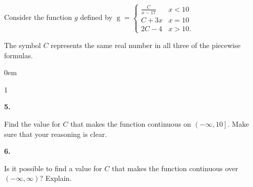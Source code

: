 \documentclass[12pt,]{book}
\newcommand{\lt}{<}
\newcommand{\gt}{>}
\theoremstyle{plain}
\theoremstyle{definition}
\numberwithin{equation}{section}
\newenvironment{exercisegroup}%
{\medskip\noindent}%
{\par\bigskip}%
\newlength{\exercisegroupindent}%
\newlength{\exercisegroupitemwidth}%
\newenvironment{exercisegrouplist}%
{\vspace{-\partopsep}%
\begin{adjustwidth}{\exercisegroupindent}{0em}}%
{\end{adjustwidth}%
\vspace{-\partopsep}%
\vspace{\baselineskip}}%
\newenvironment{exercisegroupbycol}[1]%
{\begin{exercisegrouplist}%
\vspace{-\multicolsep}%
\begin{multicols}{#1}%
\setlength{\parindent}{0em}%
\setlength{\exercisegroupitemwidth}{\linewidth}}%
{\end{multicols}%
\vspace{-\multicolsep}%
\end{exercisegrouplist}}%
\newenvironment{exercisegroupitem}[1]%
{\begin{minipage}[t]{\exercisegroupitemwidth}
\vspace{0pt}%
{\bfseries#1}%
\rule{0pt}{\baselineskip}}{\strut%
\end{minipage}%
\hspace{\columnsep}}%
\providecommand\phantomsection{}
\newcommand{\fe}[2]{\mathop{{#1}{\left(#2\right)}}}
\newcommand{\ointerval}[2]{\left(#1,#2\right)}
\newcommand{\ocinterval}[2]{\left(\left.#1,#2\right]\right.}
\begin{document}
\begin{exercisegroup}%
Consider the function \(g\) defined by \(\fe{g}{x}=\begin{cases}\frac{C}{x-17}&x\lt10\\C+3x&x=10\\2C-4&x\gt10\text{.}\end{cases}\)%
\par
The symbol \(C\) represents the same real number in all three of the piecewise formulas.%
\par
\begin{exercisegroupbycol}{1}%
\begin{exercisegroupitem}{5. }\phantomsection\hypertarget{exercise-132}{\null}
Find the value for \(C\) that makes the function continuous on \(\ocinterval{-\infty}{10}\). Make sure that your reasoning is clear.%
\end{exercisegroupitem}%
\par%
\begin{exercisegroupitem}{6. }\phantomsection\hypertarget{exercise-133}{\null}
Is it possible to find a value for \(C\) that makes the function continuous over \(\ointerval{-\infty}{\infty}\)? Explain.%
\end{exercisegroupitem}%
\par%
\end{exercisegroupbycol}%
\end{exercisegroup}%
\end{document}
